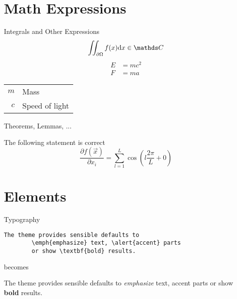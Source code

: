 \section{Math Expressions}
\begin{frame}{Integrals and Other Expressions}
	\begin{equation}
		\iint_{\partial\Omega}f(x)\diff{x} \in \complexes
	\end{equation}
	\begin{align}
		E &= mc^2\\
		F &= ma
	\end{align}

	\seprule
	
	\begin{tabular}{rl}
		$m$ & Mass\\
		$c$ & Speed of light
	\end{tabular}
\end{frame}
\begin{frame}{Theorems, Lemmas, ...}
	\begin{thm}
		The following statement is correct
		\begin{equation}
			\frac{\partial f(\vec{x})}{\partial x_i} = \sum_{l=1}^{L}\cos\left(l\frac{2\pi}{L} + 0\right)
		\end{equation}
	\end{thm}
\end{frame}

\section{Elements}

\begin{frame}[fragile]{Typography}
	\begin{verbatim}The theme provides sensible defaults to
		\emph{emphasize} text, \alert{accent} parts
		or show \textbf{bold} results.\end{verbatim}
	
	\begin{center}becomes\end{center}
	
	The theme provides sensible defaults to \emph{emphasize} text,
	\alert{accent} parts or show \textbf{bold} results.
\end{frame}

